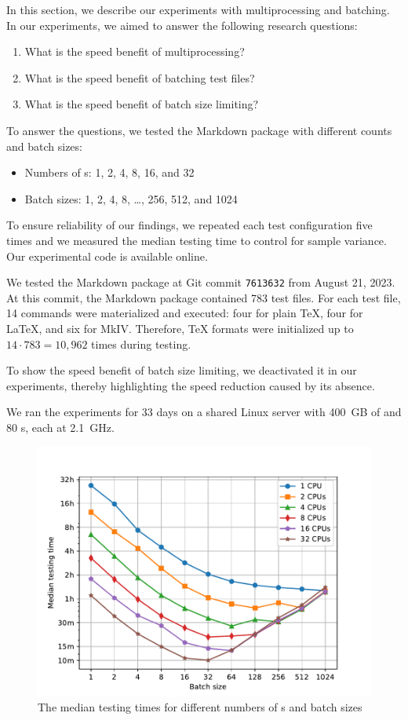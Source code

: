 \documentclass[final]{ltugboat}
\begin{document}
In this section, we describe our experiments with multiprocessing and batching. In our experiments, we aimed to answer the following research questions:
\begin{enumerate}
\item What is the speed benefit of multiprocessing?
\item What is the speed benefit of batching test files?
\item What is the speed benefit of batch size limiting?
\end{enumerate}
To answer the questions, we tested the Markdown package with different  counts and batch sizes:
\begin{itemize}
\item Numbers of s: 1, 2, 4, 8, 16, and 32
\item Batch sizes: 1, 2, 4, 8, \ldots, 256, 512, and 1024
\end{itemize}
To ensure reliability of our findings, we repeated each test configuration five times and we measured the median testing time to control for sample variance. Our experimental code is available online.~\cite{starynovotny2023measure}

We tested the Markdown package at Git commit \texttt{7613632} from August 21, 2023. At this commit, the Markdown package contained 783 test files. For each test file, 14 commands were materialized and executed: four for plain \TeX, four for \LaTeX, and six for  MkIV. Therefore, \TeX{} formats were initialized up to $14\cdot 783 = 10{,}962$ times during testing.

To show the speed benefit of batch size limiting, we deactivated it in our experiments, thereby highlighting the speed reduction caused by its absence.

We ran the experiments for 33 days on a shared Linux server with 400~GB of  and 80 s, each at 2.1~GHz.

\begin{figure}
\includegraphics[trim={0.5cm 0.3cm 1.6cm 1.4cm}, clip, width=\linewidth]{images/speed-tests}
\caption{The median testing times for different numbers of s and batch sizes}
\label{fig:results}
\end{figure}
\end{document}
